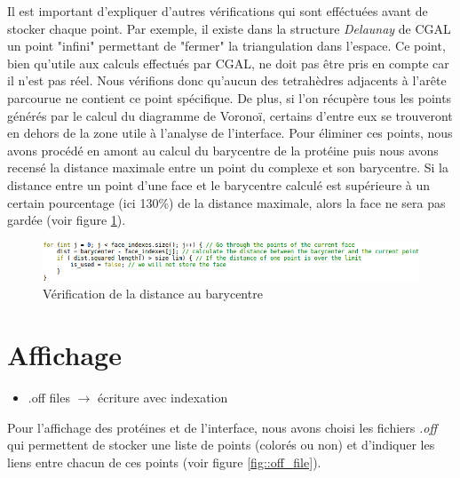 Il est important d'expliquer d'autres vérifications qui sont efféctuées avant de stocker
chaque point. Par exemple, il existe dans la structure \textit{Delaunay} de CGAL
un point "infini" permettant de "fermer" la triangulation dans l'espace. Ce point, bien
qu'utile aux calculs effectués par CGAL, ne doit pas être pris en compte car il n'est pas réel.
Nous vérifions donc qu'aucun des tetrahèdres adjacents à l'arête parcourue ne contient
ce point spécifique. De plus, si l'on récupère tous les points générés par le calcul du
diagramme de Voronoï, certains d'entre eux se trouveront en dehors de la zone utile à l'analyse
de l'interface. Pour éliminer ces points, nous avons procédé en amont au calcul
du barycentre de la protéine puis nous avons recensé la distance maximale entre un point du complexe
et son barycentre. Si la distance entre un point d'une face et le barycentre calculé
est supérieure à un certain pourcentage (ici 130\%) de la distance maximale, alors
la face ne sera pas gardée (voir figure \ref{fig::check_max_dist}).
\begin{figure}[ht]
\centering
  \includegraphics[width=\textwidth]{figures/check_max_dist.png}
  \caption{Vérification de la distance au barycentre}
  \label{fig::check_max_dist}
\end{figure}

\section{Affichage}
\begin{itemize}
  \item .off files $\to$ écriture avec indexation
\end{itemize}

Pour l'affichage des protéines et de l'interface, nous avons choisi les fichiers
\textit{.off} qui permettent de stocker une liste de points (colorés ou non) et
d'indiquer les liens entre chacun de ces points (voir figure \ref{fig::off_file}).

